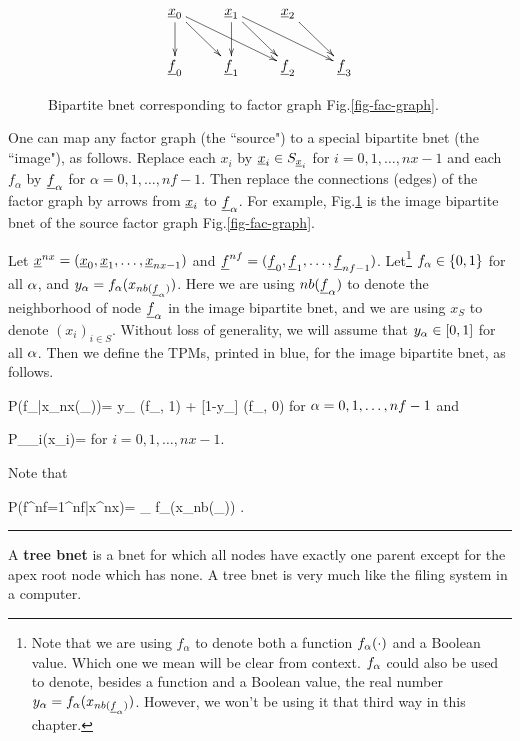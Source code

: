 \begin{figure}[h!]
\centering
$$\xymatrix{
\rvx_0\ar[d]\ar[dr]\ar[drr]
&\rvx_1\ar[d]\ar[dr]\ar[drr]
&\rvx_2\ar[dr]
\\
\rvf_0&\rvf_1&\rvf_2&\rvf_3
}$$
\caption{Bipartite bnet
corresponding to factor
graph Fig.\ref{fig-fac-graph}.}
\label{fig-bip-bnet}
\end{figure}

One
can map
any factor graph (the ``source")
to a special bipartite bnet (the ``image"),
as follows.
Replace each $x_i$ by ${\underline{x}}_i\in S_{{\underline{x}}_i}$
for $i=0,1, \ldots, nx-1$
 and each
 $f_\alpha$ by ${\underline{f}}_\alpha$
for $\alpha=0, 1, \ldots, nf-1$.
Then replace
the connections (edges)
of the factor graph
by arrows from ${\underline{x}}_i$ to
${\underline{f}}_\alpha$. For example,
Fig.\ref{fig-bip-bnet}
is the image bipartite bnet of the source factor
graph Fig.\ref{fig-fac-graph}.


Let ${\underline{x}}^{nx}=
({\underline{x}}_0, {\underline{x}}_1, \ldots, {\underline{x}}_{nx-1})$
and
${\underline{f}}^{nf}=
({\underline{f}}_0, {\underline{f}}_1, \ldots, {\underline{f}}_{nf-1})$.
Let\footnote{
Note that we are using
$f_\alpha$
to denote both a function
$f_\alpha(\cdot)$  and a Boolean
value. Which one we mean
will be clear from context.
$f_\alpha$ could also be used to
denote, besides a function and a Boolean value,
the real number
$y_\alpha=f_\alpha(x_{nb({\underline{f}}_\alpha)})$.
However, we won't be using it that third way
in this chapter.}
$f_\alpha\in \{0,1\}$ for all $\alpha$,
and $y_\alpha=
f_\alpha(x_{nb({\underline{f}}_\alpha)})$.
Here we are using $nb({\underline{f}}_\alpha)$
to denote  the neighborhood
of node ${\underline{f}}_\alpha$
in the image bipartite bnet,
and we are using $x_S$ to denote
$(x_i)_{i\in S}$.
Without loss of
generality,
we will assume
that $y_\alpha\in[0,1]$ for all $\alpha$.
Then we define the TPMs, printed
in blue, for the
image bipartite bnet, 
as follows.




\beq\color{blue}
P(f_\alpha|x_{nx(\rvf_\alpha)})=
y_\alp
\delta(f_\alp, 1)
+
[1-y_\alp]
\delta(f_\alp, 0)
\;
\eeq
for $\alpha=0, 1, \ldots , nf-1$
and

\beq\color{blue}
P_{\rvx_i}(x_i)= 
\eeq
for $i=0, 1, \ldots, nx-1$.

Note that

\beq
P(f^{nf}=1^{nf}|x^{nx})=
\prod_\alpha
f_\alpha(x_{nb(\rvf_\alpha)})
\;.
\eeq

\hrule
A {\bf tree bnet}
is a bnet for which all
nodes have exactly
one parent except
for the apex root
node which has none.
A tree bnet
is very much like
the filing system
in a computer.

